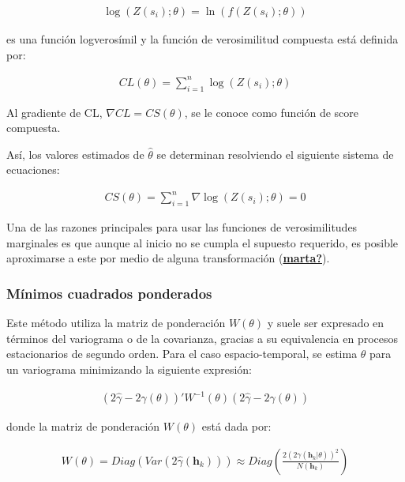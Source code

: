 \documentclass[
]{book}
\begin{document}
\begin{align}
  \log(Z(s_i);\theta)=\ln(f(Z(s_i);\theta))  
\end{align}

es una función logverosímil y la función de verosimilitud compuesta está definida por:

\begin{align}
   CL(\theta)=\sum_{i=1}^{n} \log(Z(s_i);\theta)  
\end{align}

Al gradiente de CL, \(\nabla CL=CS(\theta)\), se le conoce como función de score compuesta.

Así, los valores estimados de \(\hat{\theta}\) se determinan resolviendo el siguiente sistema de ecuaciones:

\begin{align}
   CS(\theta)=\sum_{i=1}^{n} \nabla\log(Z(s_i);\theta)=0  
\end{align}

Una de las razones principales para usar las funciones de verosimilitudes marginales es que aunque al inicio no se cumpla el supuesto requerido, es posible aproximarse a este por medio de alguna transformación (\protect\hyperlink{ref-marta}{\textbf{marta?}}).

\hypertarget{muxednimos-cuadrados-ponderados}{%
\subsubsection*{Mínimos cuadrados ponderados}\label{muxednimos-cuadrados-ponderados}}

Este método utiliza la matriz de ponderación \(W(\theta)\) y suele ser expresado en términos del variograma o de la covarianza, gracias a su equivalencia en procesos estacionarios de segundo orden. Para el caso espacio-temporal, se estima \(\theta\) para un variograma minimizando la siguiente expresión:

\begin{align}
  (2\hat{\gamma}-2\gamma(\theta))'W^{-1}(\theta)(2\hat{\gamma}-2\gamma(\theta))  
\end{align}

donde la matriz de ponderación \(W(\theta)\) está dada por:

\begin{align}
  W(\theta)=Diag(Var(2\hat{\gamma}(\textbf{h}_k)))\approx Diag\left(\frac{2(2\gamma(\textbf{h}_k|\theta))^2}{N(\textbf{h}_k)}\right)  
\end{align}
\end{document}
